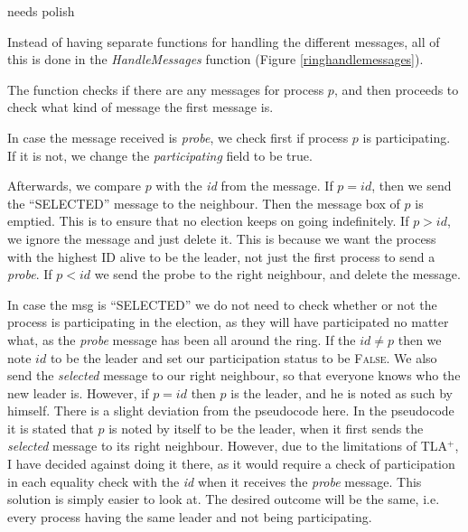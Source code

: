 \documentclass{report}
\begin{document}
  \begin{calloutyellow}
    needs polish
    \end{calloutyellow}

Instead of having separate functions for handling the different messages, all of this is done in the \textit{HandleMessages} function (Figure \ref{ringhandlemessages}).

The function checks if there are any messages for process $p$, and then proceeds to check what kind of message the first message is.

In case the message received is \textit{probe}, we check first if process $p$ is participating. If it is not, we change the \textit{participating} field to be true.

Afterwards, we compare $p$ with the \textit{id} from the message.
If $p = id$, then we send the ``SELECTED'' message to the neighbour. Then the message box of $p$ is emptied. This is to ensure that no election keeps on going indefinitely.
If $p > id$, we ignore the message and just delete it. This is because we want the process with the highest ID alive to be the leader, not just the first process to send a \textit{probe}.
If $p < id$ we send the probe to the right  neighbour, and delete the message.


In case the msg is ``SELECTED'' we do not need to check whether or not the process is participating in the election, as they will have participated no matter what, as the \textit{probe} message has been all around the ring. If the $id \neq p$ then we note $id$ to be the leader and set our participation status to be \textsc{False}. We also send the \textit{selected} message to our right neighbour, so that everyone knows who the new leader is. However, if $p = id$ then $p$ is the leader, and he is noted as such by himself. There is a slight deviation from the pseudocode here. In the pseudocode it is stated that $p$ is noted by itself to be the leader, when it first sends the \textit{selected} message to its right neighbour. However, due to the limitations of TLA$^{+}$, I have decided against doing it there, as it would require a check of participation in each equality check with the \textit{id} when it receives the \textit{probe} message. This solution is simply easier to look at. The desired outcome will be the same, i.e. every process having the same leader and not being participating.
\end{document}
